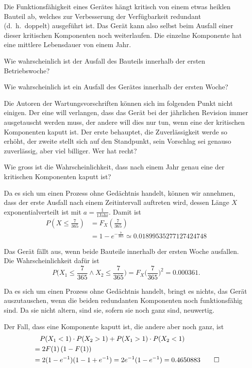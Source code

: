 Die Funktionsfähigkeit eines Gerätes hängt kritisch von einem etwas
heiklen Bauteil ab, welches zur Verbesserung der Verfügbarkeit redundant
(d.~h.~doppelt)
ausgeführt ist. Das Gerät kann also selbst beim Ausfall einer dieser
kritischen
Komponenten noch weiterlaufen. Die einzelne Komponente hat eine mittlere
Lebensdauer von einem Jahr.
\begin{teilaufgaben}
\item Wie wahrscheinlich ist der Ausfall des Bauteils innerhalb der
ersten Betriebswoche?
\item Wie wahrscheinlich ist ein Ausfall des Gerätes innerhalb der
ersten Woche?
\item Die Autoren der Wartungsvorschriften können sich im folgenden Punkt
nicht einigen. Der eine will verlangen, dass das Gerät bei der jährlichen
Revision immer ausgetauscht werden muss, der andere will dies nur tun, wenn
eine der kritischen Komponenten kaputt ist.
Der erste behauptet, die Zuverlässigkeit werde so erhöht, der zweite
stellt sich auf den Standpunkt, sein Vorschlag sei genauso zuverlässig,
aber viel billiger. Wer hat recht?
\item
Wie gross ist die Wahrscheinlichkeit, dass nach einem Jahr genau
eine der kritischen Komponenten kaputt ist?
\end{teilaufgaben}


\begin{loesung}
\begin{teilaufgaben}
\item Da es sich um einen Prozess ohne Gedächtnis handelt, können wir
annehmen, dass der erste Ausfall nach einem Zeitintervall auftreten
wird, dessen Länge $X$ exponentialverteilt ist mit $a=\frac1{1\text{Jahr}}$.
Damit ist
\begin{align*}
P\left(X\le \frac{7}{365}\right)
&=
F_X\left(\frac{7}{365}\right)\\
&=
1-e^{-\frac{7}{365}}
\simeq
0.01899535277127424748
\end{align*}
\item
Das Gerät fällt aus, wenn beide Bauteile innerhalb der ersten
Woche ausfallen. Die Wahrscheinlichkeit dafür ist
\[
P\biggl(X_1\le \frac{7}{365}\wedge X_2\le \frac{7}{365}\biggr)
=F_X\biggl(\frac{7}{365}\biggr)^2=0.000361.
\]
\item
Da es sich um einen Prozess ohne Gedächtnis handelt, bringt es
nichts, das Gerät auszutauschen, wenn die beiden redundanten Komponenten
noch funktionsfähig sind. Da sie nicht altern, sind sie, sofern sie
noch ganz sind, neuwertig.
\item
Der Fall, dass eine Komponente kaputt ist, die andere aber noch ganz,
ist
\begin{align*}
&\quad P(X_1 < 1)\cdot P(X_2>1)
+P(X_1 > 1)\cdot P(X_2<1)
\\
&=
2F(1)\,(1-F(1))
\\
&=
2(1-e^{-1})(1-1+e^{-1})=2e^{-1}(1-e^{-1})=0.4650883
\qedhere
\end{align*}
\end{teilaufgaben}
\end{loesung}


